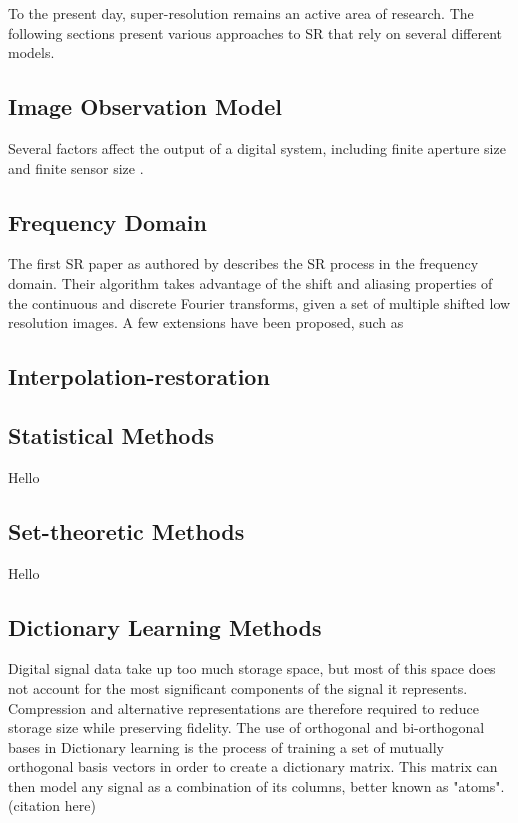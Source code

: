 To the present day, super-resolution remains an active area of research. 
The following sections present various approaches to SR that rely on several different models.

\subsection{Image Observation Model}

Several factors affect the output of a digital system, including finite aperture size and finite sensor size \citep{Yang2010a}. 

\subsection{Frequency Domain}
The first SR paper as authored by \cite{tsai1984multiframe} describes the SR process in the frequency domain. 
Their algorithm takes advantage of the shift and aliasing properties of the continuous and discrete Fourier transforms, given a set of multiple shifted low resolution images. 
A few extensions have been proposed, such as 
\citep{Yang2010a}

\subsection{Interpolation-restoration}

\citep{Yang2010}

\subsection{Statistical Methods}
Hello
\citep{Yang2010a}

\subsection{Set-theoretic Methods}
Hello
\citep{Yang2010a}

\subsection{Dictionary Learning Methods}
Digital signal data take up too much storage space, but most of this space does not account for the most significant components of the signal it represents.
Compression and alternative representations are therefore required to reduce storage size while preserving fidelity.
The use of orthogonal and bi-orthogonal bases in 
Dictionary learning is the process of training a set of mutually orthogonal basis vectors in order to create a dictionary matrix. 
This matrix can then model any signal as a combination of its columns, better known as "atoms". (citation here)

